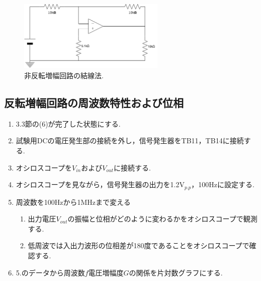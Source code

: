 \documentclass[twocolumn, 10pt,a4j]{jsarticle}
\begin{document}
        \begin{figure}[]
          \begin{center}
              \includegraphics[width=7cm]{../img/hi_hanten_zoufuku_kairo.png}
              \caption{非反転増幅回路の結線法.}
          \end{center}
        \end{figure}


    \subsection{反転増幅回路の周波数特性および位相}
        \begin{enumerate}
            \item 3.3節の(6)が完了した状態にする. \\
            \item 試験用DCの電圧発生部の接続を外し，信号発生器をTB11，TB14に接続する. \\
            \item オシロスコープを$V_{in}$および$V_{out}$に接続する.
            \item オシロスコープを見ながら，信号発生器の出力を1.2V$_{p.p}$，100Hzに設定する. \\
            \item 周波数を100Hzから1MHzまで変える \\
              \begin{enumerate}
                \item 出力電圧$V_{out}$の振幅と位相がどのように変わるかをオシロスコープで観測する. \\
                \item 低周波では入出力波形の位相差が180度であることをオシロスコープで確認する. \\
              \end{enumerate}
            \item 5.のデータから周波数$f$電圧増幅度$G$の関係を片対数グラフにする.
        \end{enumerate}
\end{document}

